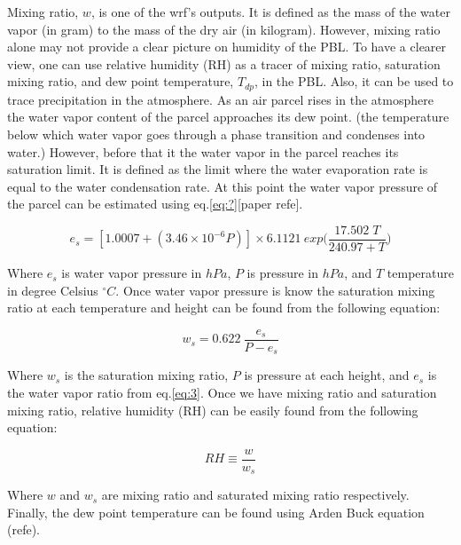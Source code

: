 \documentclass[a4paper,12pt]{article}
\numberwithin{equation}{section} %
\begin{document}
Mixing ratio, $w$, is one of the wrf's outputs. It is defined as the mass of the water vapor (in gram) to the mass of the dry air (in kilogram). However, mixing ratio alone may not provide a clear picture on humidity of the PBL. To have a clearer view, one can use relative humidity (RH) as a tracer of mixing ratio, saturation mixing ratio, and dew point temperature, $T_{dp}$, in the PBL. Also, it can be used to trace precipitation in the atmosphere. As an air parcel rises in the atmosphere the water vapor content of the parcel approaches its dew point. (the temperature below which water vapor goes through a phase transition and condenses into water.) However, before that it the water vapor in the parcel reaches its saturation limit. It is defined as the limit where the water evaporation rate is equal to the water condensation rate. At this point the water vapor pressure of the parcel can be estimated using eq.\ref{eq:?}[paper refe]. 

\vspace{0.25cm}
\begin{equation}\label{eq:3}
e_s = [1.0007 + (3.46 \times 10^{-6} P)] \times 6.1121 \: exp\Big(\frac{17.502\; T}{240.97 + T}\Big)
\end{equation}
\vspace{0.25cm}

Where $e_s$ is water vapor pressure in $hPa$, $P$ is pressure in $hPa$, and $T$ temperature in degree Celsius $^\circ C$.
Once water vapor pressure is know the saturation mixing ratio at each temperature and height can be found from the following equation:

\vspace{0.25cm}
\begin{equation}\label{eq:4}
w_s = 0.622 \: \frac{e_s}{P - e_s}
\end{equation}
\vspace{0.25cm}

Where $w_s$ is the saturation mixing ratio, $P$ is pressure at each height, and $e_s$ is the water vapor ratio from eq.\ref{eq:3}. Once we have mixing ratio and saturation mixing ratio, relative humidity (RH) can be easily found from the following equation:

\vspace{0.25cm}
\begin{equation}
RH\equiv\frac{w}{w_s}
\end{equation}
\vspace{0.25cm}

Where $w$ and $w_s$ are mixing ratio and saturated mixing ratio respectively. Finally, the dew point temperature can be found using Arden Buck equation (refe).
\end{document}
